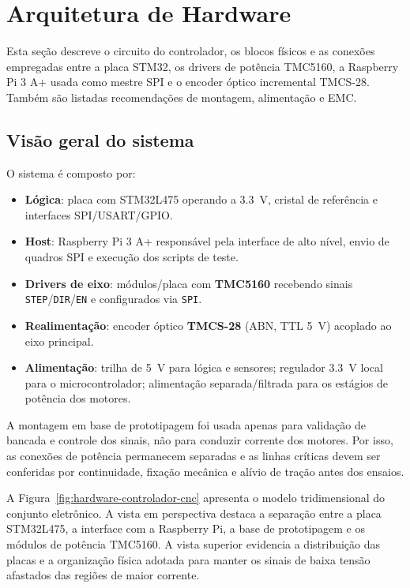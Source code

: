 \section{Arquitetura de Hardware}\label{sec:arq_hw}

Esta se\c{c}\~ao descreve o circuito do controlador, os blocos f\'isicos
e as conex\~oes empregadas entre a placa STM32, os drivers de pot\^encia
TMC5160, a Raspberry Pi 3 A+ usada como mestre SPI e o encoder
\'{o}ptico incremental TMCS-28. Tamb\'em s\~ao listadas recomenda\c{c}\~oes
de montagem, alimenta\c{c}\~ao e EMC.

\subsection{Vis\~ao geral do sistema}

O sistema \'e composto por:

\begin{itemize}
\item \textbf{L\'ogica}: placa com STM32L475 operando a \SI{3.3}{V}, cristal de
  refer\^encia e interfaces SPI/USART/GPIO.
\item \textbf{Host}: Raspberry Pi 3 A+ respons\'avel pela interface de
  alto n\'ivel, envio de quadros SPI e execu\c{c}\~ao dos scripts de teste.
\item \textbf{Drivers de eixo}: m\'odulos/placa com \textbf{TMC5160} recebendo
  sinais \texttt{STEP}/\texttt{DIR}/\texttt{EN} e configurados via \texttt{SPI}.
\item \textbf{Realimenta\c{c}\~ao}: encoder \'{o}ptico \textbf{TMCS-28} (ABN, TTL
  \SI{5}{V}) acoplado ao eixo principal.
\item \textbf{Alimenta\c{c}\~ao}: trilha de \SI{5}{V} para l\'ogica e sensores;
  regulador \SI{3.3}{V} local para o microcontrolador; alimenta\c{c}\~ao separada/filtrada
  para os est\'agios de pot\^encia dos motores.
\end{itemize}

A montagem em base de prototipagem foi usada apenas para valida\c{c}\~ao de
bancada e controle dos sinais, n\~ao para conduzir corrente dos motores. Por
isso, as conex\~oes de pot\^encia permanecem separadas e as linhas cr\'iticas
devem ser conferidas por continuidade, fixa\c{c}\~ao mec\^anica e al\'ivio de
tra\c{c}\~ao antes dos ensaios.

A Figura~\ref{fig:hardware-controlador-cnc} apresenta o modelo
tridimensional do conjunto eletr\^onico. A vista em perspectiva destaca a
separa\c{c}\~ao entre a placa STM32L475, a interface com a Raspberry Pi,
a base de prototipagem e os m\'odulos de pot\^encia TMC5160. A vista
superior evidencia a distribui\c{c}\~ao das placas e a organiza\c{c}\~ao
f\'isica adotada para manter os sinais de baixa tens\~ao afastados das
regi\~oes de maior corrente.


